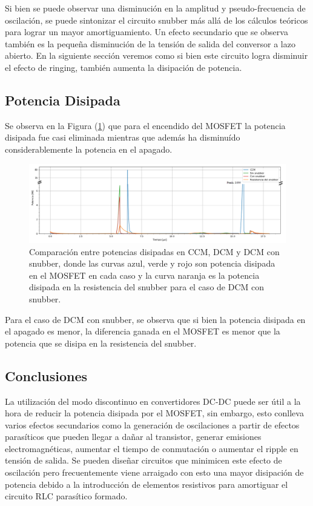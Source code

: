 Si bien se puede observar una disminución en la amplitud y pseudo-frecuencia de oscilación, se puede sintonizar el circuito snubber más allá de los cálculos teóricos para lograr un mayor amortiguamiento. Un efecto secundario que se observa también es la pequeña disminución de la tensión de salida del conversor a lazo abierto. En la siguiente sección veremos como si bien este circuito logra disminuir el efecto de ringing, también aumenta la disipación de potencia.

\subsection{Potencia Disipada}

Se observa en la Figura (\ref{ej4:fig:pots}) que para el encendido del MOSFET la potencia disipada fue casi eliminada mientras que además ha disminuído considerablemente la potencia en el apagado.

\begin{figure}[H]
	\centering
	\includegraphics[width=\linewidth]{ImagenesEjercicio-4/potencias-crop-partidas}
	\caption{Comparación entre potencias disipadas en CCM, DCM y DCM con snubber, donde las curvas azul, verde y rojo son potencia disipada en el MOSFET en cada caso y la curva naranja es la potencia disipada en la resistencia del snubber para el caso de DCM con snubber.}
	\label{ej4:fig:pots}
\end{figure}

Para el caso de DCM con snubber, se observa que si bien la potencia disipada en el apagado es menor, la diferencia ganada en el MOSFET es menor que la potencia que se disipa en la resistencia del snubber.


\subsection{Conclusiones}
La utilización del modo discontinuo en convertidores DC-DC puede ser útil a la hora de reducir la potencia disipada por el MOSFET, sin embargo, esto conlleva varios efectos secundarios como la generación de oscilaciones a partir de efectos parasíticos que pueden llegar a dañar al transistor, generar emisiones electromagnéticas, aumentar el tiempo de conmutación o aumentar el ripple en tensión de salida. Se pueden diseñar circuitos que minimicen este efecto de oscilación pero frecuentemente viene arraigado con esto una mayor disipación de potencia debido a la introducción de elementos resistivos para amortiguar el circuito RLC parasítico formado.

%

